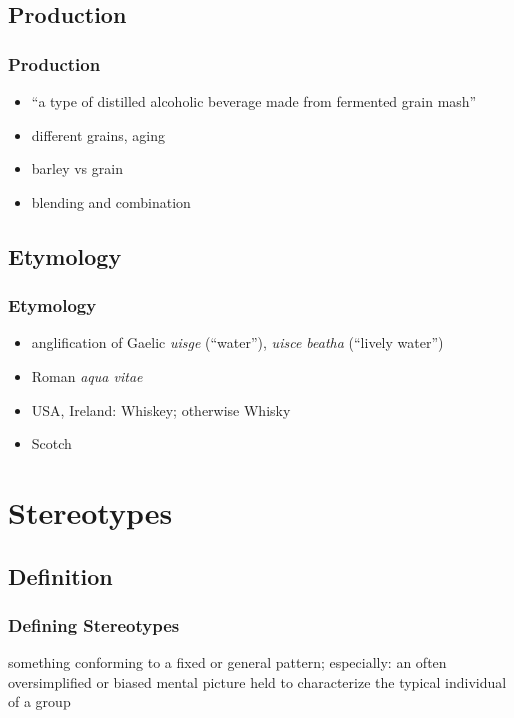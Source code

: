 \documentclass{beamer}
\begin{document}
\subsection{Production}

\begin{frame}
 \frametitle{Production}
 \begin{itemize}
  \item ``a type of distilled alcoholic beverage made from fermented grain mash''
  \item different grains, aging
  \item barley vs grain
  \item blending and combination
 \end{itemize}
\end{frame}

\subsection{Etymology}

\begin{frame}
 \frametitle{Etymology}
 \begin{itemize}
  \item anglification of Gaelic \emph{uisge} (``water''), \emph{uisce beatha} (``lively water'')
  \item Roman \emph{aqua vitae}
  \item USA, Ireland: Whiskey; otherwise Whisky
  \item Scotch
 \end{itemize}
\end{frame}

\section{Stereotypes}

\subsection{Definition}

\begin{frame}
 \frametitle{Defining Stereotypes}
  \begin{definition}[Webster's]
    something conforming to a fixed or general pattern; especially: an often oversimplified or biased mental picture held to characterize the typical individual of a group
  \end{definition}
\end{frame}
\end{document}
